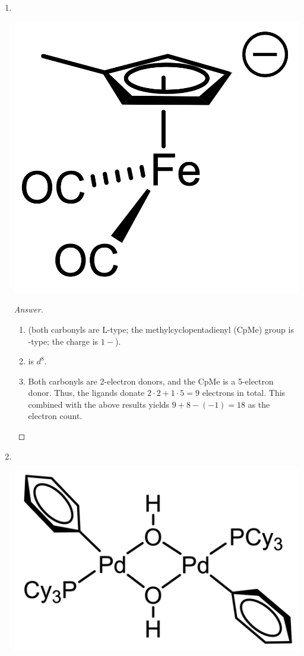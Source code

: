 \documentclass[../psets.tex]{subfiles}
\begin{document}
\begin{enumerate}
\begin{enumerate}[label={\arabic*)}]
\begin{proof}[Answer]
\begin{enumerate}[label={(\roman*)}]
                \item Each Cp is a 5-electron donor, and both $\mu$-Me groups are 3-electron donors. Thus, the ligands donate $4\cdot 5+2\cdot 3=26$ electrons in total. This combined with the above results yields $\frac{26+2\cdot 3}{2}=16$ as the electron count at each yttrium. Since neither yttrium has extra $d$ electrons, there will be no  bonds.
            \end{enumerate}
        \end{proof}
        \item ${\color{white}hi}$
        \vspace{-1em}
        \begin{center}
            \includegraphics[width=0.18\linewidth]{../ExtFiles/pset1-1-11.png}
        \end{center}
        \begin{proof}[Answer]\leavevmode
            \begin{enumerate}[label={(\roman*)}]
                \item {} (both carbonyls are L-type; the methylcyclopentadienyl (CpMe) group is -type; the charge is $1-$).
                \item {} is $d^8$.
                \item Both carbonyls are 2-electron donors, and the CpMe is a 5-electron donor. Thus, the ligands donate $2\cdot 2+1\cdot 5=9$ electrons in total. This combined with the above results yields $9+8-(-1)=18$ as the electron count.
            \end{enumerate}
        \end{proof}
        \item ${\color{white}hi}$
        \vspace{-1em}
        \begin{center}
            \includegraphics[width=0.34\linewidth]{../ExtFiles/pset1-1-12.png}
        \end{center}

\end{enumerate}
\end{enumerate}
\end{document}
